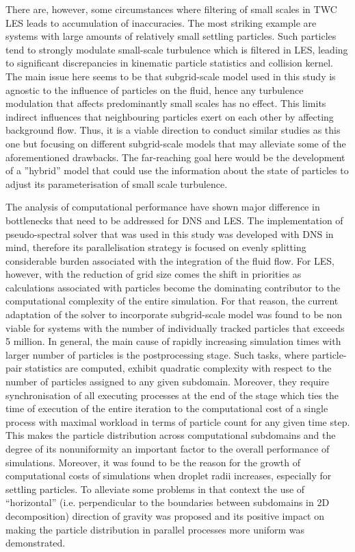 \documentclass{pracamgren}
\begin{document}
There are, however, some circumstances where filtering of small scales in TWC LES leads to accumulation of inaccuracies.
The most striking example are systems with large amounts of relatively small settling particles.
Such particles tend to strongly modulate small-scale turbulence which is filtered in LES, leading to significant discrepancies in kinematic particle statistics and collision kernel.
The main issue here seems to be that subgrid-scale model used in this study is agnostic to the influence of particles on the fluid, hence any turbulence modulation that affects predominantly small scales has no effect.
This limits indirect influences that neighbouring particles exert on each other by affecting background flow.
Thus, it is a viable direction to conduct similar studies as this one but focusing on different subgrid-scale models that may alleviate some of the aforementioned drawbacks.
The far-reaching goal here would be the development of a ''hybrid'' model that could use the information about the state of particles to adjust its parameterisation of small scale turbulence.

The analysis of computational performance have shown major difference in bottlenecks that need to be addressed for DNS and LES.
The implementation of pseudo-spectral solver that was used in this study was developed with DNS in mind, therefore its parallelisation strategy is focused on evenly splitting considerable burden associated with the integration of the fluid flow.
For LES, however, with the reduction of grid size comes the shift in priorities as calculations associated with particles become the dominating contributor to the computational complexity of the entire simulation.
For that reason, the current adaptation of the solver to incorporate subgrid-scale model was found to be non viable for systems with the number of individually tracked particles that exceeds 5 million.
In general, the main cause of rapidly increasing simulation times with larger number of particles is the postprocessing stage.
Such tasks, where particle-pair statistics are computed, exhibit quadratic complexity with respect to the number of particles assigned to any given subdomain.
Moreover, they require synchronisation of all executing processes at the end of the stage which ties the time of execution of the entire iteration to the computational cost of a single process with maximal workload in terms of particle count for any given time step.
This makes the particle distribution across computational subdomains and the degree of its nonuniformity an important factor to the overall performance of simulations.
Moreover, it was found to be the reason for the growth of computational costs of simulations when droplet radii increases, especially for settling particles.
To alleviate some problems in that context the use of ``horizontal'' (i.e. perpendicular to the boundaries between subdomains in 2D decomposition) direction of gravity was proposed and its positive impact on making the particle distribution in parallel processes more uniform was demonstrated.
\end{document}
